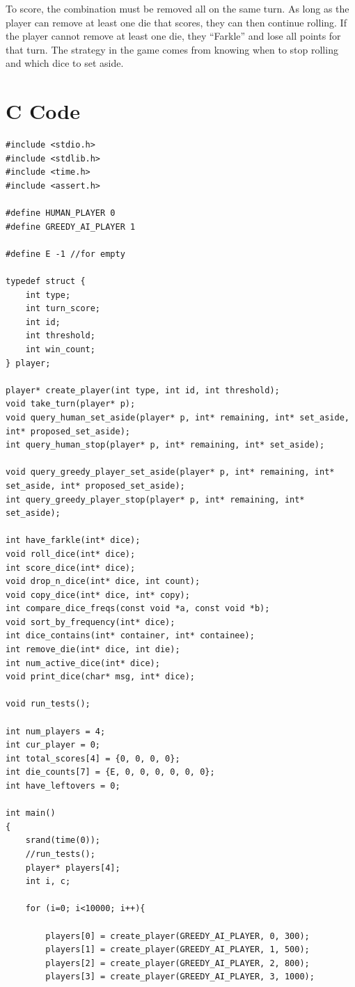 \documentclass{article}
\begin{document}
To score, the combination must be removed all on the same turn.  As long as the
player can remove at least one die that scores, they can then continue rolling.
If the player cannot remove at least one die, they ``Farkle'' and lose all
points for that turn.  The strategy in the game comes from knowing when to stop
rolling and which dice to set aside.

\section{C Code}

\begin{verbatim}
#include <stdio.h>
#include <stdlib.h>
#include <time.h>
#include <assert.h>

#define HUMAN_PLAYER 0
#define GREEDY_AI_PLAYER 1

#define E -1 //for empty

typedef struct {
    int type;
    int turn_score;
    int id;
    int threshold;
    int win_count;
} player;

player* create_player(int type, int id, int threshold);
void take_turn(player* p);
void query_human_set_aside(player* p, int* remaining, int* set_aside, int* proposed_set_aside);
int query_human_stop(player* p, int* remaining, int* set_aside);

void query_greedy_player_set_aside(player* p, int* remaining, int* set_aside, int* proposed_set_aside);
int query_greedy_player_stop(player* p, int* remaining, int* set_aside);

int have_farkle(int* dice);
void roll_dice(int* dice);
int score_dice(int* dice);
void drop_n_dice(int* dice, int count);
void copy_dice(int* dice, int* copy);
int compare_dice_freqs(const void *a, const void *b);
void sort_by_frequency(int* dice);
int dice_contains(int* container, int* containee);
int remove_die(int* dice, int die);
int num_active_dice(int* dice);
void print_dice(char* msg, int* dice);

void run_tests();

int num_players = 4;
int cur_player = 0;
int total_scores[4] = {0, 0, 0, 0};
int die_counts[7] = {E, 0, 0, 0, 0, 0, 0};
int have_leftovers = 0;

int main()
{
    srand(time(0));
    //run_tests();
    player* players[4];
    int i, c;

    for (i=0; i<10000; i++){

        players[0] = create_player(GREEDY_AI_PLAYER, 0, 300);
        players[1] = create_player(GREEDY_AI_PLAYER, 1, 500);
        players[2] = create_player(GREEDY_AI_PLAYER, 2, 800);
        players[3] = create_player(GREEDY_AI_PLAYER, 3, 1000);


\end{verbatim}
\end{document}
